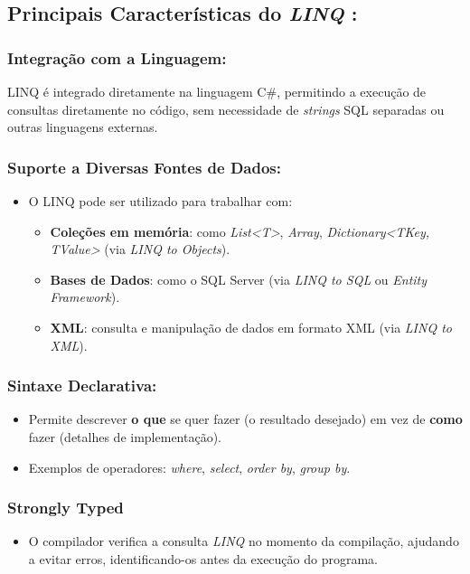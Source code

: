 \documentclass[11pt]{scrartcl} %
\begin{document}
\subsection{Principais Características do \textit{LINQ} :}

\subsubsection{Integração com a Linguagem:}

LINQ é integrado diretamente na linguagem C\#, permitindo a execução de consultas diretamente no código, sem necessidade de \textit{strings} SQL separadas ou outras linguagens externas.

\subsubsection{Suporte a Diversas Fontes de Dados:}
\begin{itemize}
	\item O LINQ pode ser utilizado para trabalhar com:
		\begin{itemize}
			\item \textbf{Coleções em memória}: como \textit{List<T>}, \textit{Array}, \textit{Dictionary<TKey, TValue>} (via \textit{LINQ to Objects}).
			\item \textbf{Bases de Dados}: como o SQL Server (via \textit{LINQ to SQL} ou \textit{Entity Framework}).
			\item \textbf{XML}: consulta e manipulação de dados em formato XML (via \textit{LINQ to XML}).	
		\end{itemize}
\end{itemize}

\subsubsection{Sintaxe Declarativa:}
\begin{itemize}
	\item Permite descrever \textbf{o que} se quer fazer (o resultado desejado) em vez de \textbf{como} fazer (detalhes de implementação).
	\item Exemplos de operadores: \textit{where}, \textit{select}, \textit{order by}, \textit{group by}.
\end{itemize}

\subsubsection{Strongly Typed}
\begin{itemize}
	\item O compilador verifica a consulta \textit{LINQ} no momento da compilação, ajudando a evitar erros, identificando-os antes da execução do programa.
\end{itemize}
\end{document}
